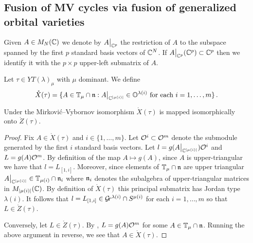 \documentclass{article}
\begin{document}
\subsection{Fusion of MV cycles via fusion of generalized orbital varieties}

Given $A \in M_N(\mathbb C)$ we denote by $A\big|_{\mathbb C^p}$ the restriction of $A$ to the subspace spanned by the first $p$ standard basis vectors of $\mathbb C^N$.  If $A\big|_{\mathbb C^p}(\mathbb C^p)\subset\mathbb C^p$ then we identify it with the $p\times p$ upper-left submatrix of $A$. 

Let $\tau\in YT(\lambda)_\mu$ with $\mu$ dominant. We define
\[
\mathring X(\tau) = 
    \{
        A \in  \mathbb T_\mu\cap\mathfrak n : A\big|_{\mathbb C^{|\mu(i)|}} \in \mathbb O^{\lambda(i)} \text{ for each } i = 1,\dots,m
    \}\,.
\]

\begin{lemma}\label{lem:XtZt}
    Under the Mirkovi\'c--Vybornov isomorphism $\mathring X(\tau)$ is mapped isomorphically onto $\mathring Z(\tau)$. 
\end{lemma}
% 
\begin{proof}
Fix $A\in\mathring X(\tau)$ and $i\in\{1,\dots,m\}$. Let $\mathcal O^i\subset\mathcal O^m$ denote the submodule generated by the first $i$ standard basis vectors. Let $l = g(A\big|_{\mathbb C^{\lvert\mu(i)\rvert}}) \mathcal O^i$ and $L = g(A) \mathcal O^m$. By definition of the map $A \mapsto g(A)$, since $ A $ is upper-triangular we have that $l = L_{[1,i]}$. 
Moreover, since elements of $\mathbb T_\mu\cap\mathfrak n$ are upper triangular $A\big|_{\mathbb C^{\lvert\mu(i)\rvert}}\in\mathbb T_{\mu(i)}\cap\mathfrak n_i$ where $\mathfrak n_i$ denotes the subalgebra of upper-triangular matrices in $M_{\lvert\mu(i)\rvert}(\mathbb C)$. 
By definition of $\mathring X(\tau)$ this principal submatrix has Jordan type $\lambda(i)$. It follows that $l = L_{[1,i]} \in \mathcal{G}\!r^{\lambda(i)} \cap S^{\mu(i)}$ for each $i=1,\dots,m$ so that $L\in\mathring Z(\tau)$. 

Conversely, let $ L \in \mathring Z(\tau) $.  By , $ L = g(A)\mathcal O^m$ for some $ A \in \mathbb T_\mu \cap \mathfrak n $.  Running the above argument in reverse, we see that $ A \in \mathring X(\tau)$. 
\end{proof}
\end{document}
